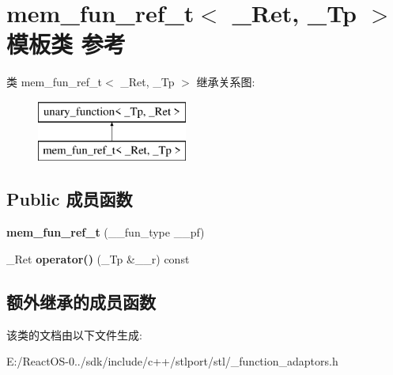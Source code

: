 \hypertarget{classmem__fun__ref__t}{}\section{mem\+\_\+fun\+\_\+ref\+\_\+t$<$ \+\_\+\+Ret, \+\_\+\+Tp $>$ 模板类 参考}
\label{classmem__fun__ref__t}
类 mem\+\_\+fun\+\_\+ref\+\_\+t$<$ \+\_\+\+Ret, \+\_\+\+Tp $>$ 继承关系图\+:\begin{figure}[H]
\begin{center}
\leavevmode
\includegraphics[height=2.000000cm]{classmem__fun__ref__t}
\end{center}
\end{figure}
\subsection*{Public 成员函数}
\begin{DoxyCompactItemize}
\item 
\mbox{\label{classmem__fun__ref__t_adfbd97caaa7112f21fdea19b1bdbdabb}} 
{\bfseries mem\+\_\+fun\+\_\+ref\+\_\+t} (\+\_\+\+\_\+fun\+\_\+type \+\_\+\+\_\+pf)
\item 
\mbox{\label{classmem__fun__ref__t_a8917ca622aa7b064ad6c21aa1b096853}} 
\+\_\+\+Ret {\bfseries operator()} (\+\_\+\+Tp \&\+\_\+\+\_\+r) const
\end{DoxyCompactItemize}
\subsection*{额外继承的成员函数}


该类的文档由以下文件生成\+:\begin{DoxyCompactItemize}
\item 
E\+:/\+React\+O\+S-\/0../sdk/include/c++/stlport/stl/\+\_\+function\+\_\+adaptors.\+h\end{DoxyCompactItemize}
